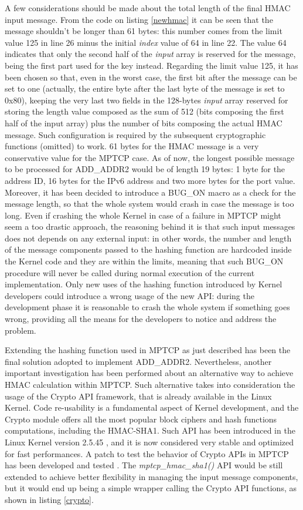 A few considerations should be made about the total length of the final HMAC input message. From the code on listing \ref{newhmac} it can be seen that the message shouldn't be longer than 61 bytes: this number comes from the limit value 125 in line 26 minus the initial \textit{index} value of 64 in line 22. The value 64 indicates that only the second half of the \textit{input} array is reserved for the message, being the first part used for the key instead. Regarding the limit value 125, it has been chosen so that, even in the worst case, the first bit after the message can be set to one (actually, the entire byte after the last byte of the message is set to 0x80), keeping the very last two fields in the 128-bytes \textit{input} array reserved for storing the length value composed as the sum of 512 (bits composing the first half of the input array) plus the number of bits composing the actual HMAC message. Such configuration is required by the subsequent cryptographic functions (omitted) to work.
61 bytes for the HMAC message is a very conservative value for the MPTCP case. As of now, the longest possible message to be processed for ADD\_ADDR2 would be of length 19 bytes: 1 byte for the address ID, 16 bytes for the IPv6 address and two more bytes for the port value.
Moreover, it has been decided to introduce a BUG\_ON macro as a check for the message length, so that the whole system would crash in case the message is too long. Even if crashing the whole Kernel in case of a failure in MPTCP might seem a too drastic approach, the reasoning behind it is that such input messages does not depends on any external input: in other words, the number and length of the message components passed to the hashing function are hardcoded inside the Kernel code and they are within the limits, meaning that such BUG\_ON procedure will never be called during normal execution of the current implementation. Only new uses of the hashing function introduced by Kernel developers could introduce a wrong usage of the new API: during the development phase it is reasonable to crash the whole system if something goes wrong, providing all the means for the developers to notice and address the problem.

Extending the hashing function used in MPTCP as just described has been the final solution adopted to implement ADD\_ADDR2. Nevertheless, another important investigation has been performed about an alternative way to achieve HMAC calculation within MPTCP. Such alternative takes into consideration the usage of the Crypto API framework, that is already available in the Linux Kernel. Code re-usability is a fundamental aspect of Kernel development, and the Crypto module offers all the most popular block ciphers and hash functions computations, including the HMAC-SHA1. Such API has been introduced in the Linux Kernel version 2.5.45 \cite{cryptoinkernel}, and it is now considered very stable and optimized for fast performances.
A patch to test the behavior of Crypto APIs in MPTCP has been developed and tested \cite{cryptopatch1} \cite{cryptopatch2}. The \textit{mptcp\_hmac\_sha1()} API would be still extended to achieve better flexibility in managing the input message components, but it would end up being a simple wrapper calling the Crypto API functions, as shown in listing \ref{crypto}.

